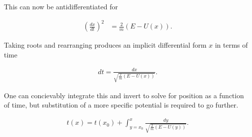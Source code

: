This can now be antidifferentiated for

\begin{align}\label{eqn:1dpotentialIntegral:3}
\left( \frac{dx}{dt} \right)^2 &= \frac{2}{m} (E - U(x)).
\end{align}

Taking roots and rearranging produces an implicit differential form $x$ in terms of time

\begin{align}\label{eqn:1dpotentialIntegral:4}
dt = \frac{dx}{\sqrt{ \frac{2}{m} (E - U(x)) } }.
\end{align}

One can concievably integrate this and invert to solve for position as a function of time, but substitution of a more specific potential is required to go further.

\begin{align}\label{eqn:1dpotentialIntegral:5}
t(x) = t(x_0) + \int_{y=x_0}^{x} \frac{dy}{\sqrt{ \frac{2}{m} (E - U(y)) } }.
\end{align}

\EndNoBibArticle
